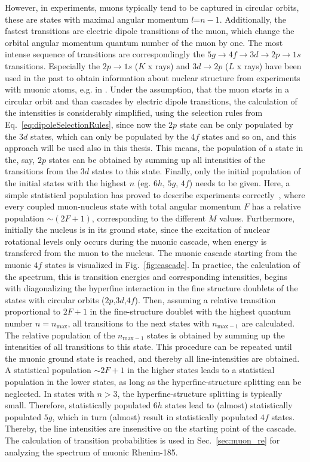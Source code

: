 However, in experiments, muons typically tend to be captured in circular orbits, these are states with maximal angular momentum $l$=$n-1$. Additionally, the fastest transitions are electric dipole transitions of the muon, which change the orbital angular momentum quantum number of the muon by one. The most intense sequence of transitions are correspondingly the $5g\rightarrow 4f \rightarrow 3d \rightarrow 2p \rightarrow 1s$ transitions. Especially the $2p\rightarrow 1s$ ($K$ x rays) and $3d\rightarrow 2p$ ($L$ x rays) have been used in the past to obtain information about nuclear structure from experiments with muonic atoms, e.g. in \cite{tanaka1983,tanaka1984,tanaka1984_2,hitlin1970,Dey1979,dewit1966,Bergem1988}. Under the assumption, that the muon starts in a circular orbit and than cascades by electric dipole transitions, the calculation of the intensities is considerably simplified, using the selection rules from Eq.~\eqref{eq:dipoleSelectionRules}, since now the $2p$ state can be only populated by the $3d$ states, which can only be populated by the $4f$ states and so on, and this approach will be used also in this thesis. This means, the population of a state in the, say, $2p$ states can be obtained by summing up all intensities of the transitions from the $3d$ states to this state. Finally, only the initial population of the initial states with the highest $n$ (eg. $6h$, $5g$, $4f$) needs to be given. Here, a simple statistical population has proved to describe experiments correctly~\cite{Dey1979}, where every coupled muon-nucleus state with total angular momentum $F$ has a relative population $\sim (2F+1)$, corresponding to the different $M$ values. Furthermore, initially the nucleus is in its ground state, since the excitation of nuclear rotational levels only occurs during the muonic cascade, when energy is transfered from the muon to the nucleus.
The muonic cascade starting from the muonic $4f$ states is visualized in Fig.~\ref{fig:cascade}. In practice, the calculation of the spectrum, this is transition energies and corresponding intensities, begins with diagonalizing the hyperfine interaction in the fine structure doublets of the states with circular orbits ($2p$,$3d$,$4f$). Then, assuming a relative transition proportional to $2F+1$ in the fine-structure doublet with the highest quantum number $n=n_{\text{max}}$, all transitions to the next states with $n_{\text{max}-1}$ are calculated. The relative population of the $n_{\text{max}-1}$ states is obtained by summing up the intensities of all transitions to this state. This procedure can be repeated until the muonic ground state is reached, and thereby all line-intensities are obtained. A statistical population $\sim 2F+1$ in the higher states leads to a statistical population in the lower states, as long as the hyperfine-structure  splitting can be neglected. In states with $n>3$, the hyperfine-structure splitting is typically small. Therefore, statistically populated $6h$ states lead to (almost) statistically populated $5g$, which in turn (almost) result in statistically populated $4f$ states. Thereby, the line intensities are insensitive on the starting point of the cascade. The calculation of transition probabilities is used in Sec.~\ref{sec:muon_re} for analyzing the spectrum of muonic Rhenim-185.
